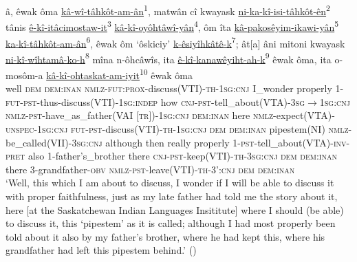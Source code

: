 \documentclass[twoside,a4paper,11pt]{article}
\newcommand{\sg}{\textsc{sg}}
\newcommand{\Σ}{\greek{Σ}}
\newcommand{\cnj}{\textsc{cnj}}
\newcommand{\dem}{\textsc{dem}}
\newcommand{\fut}{\textsc{fut}}
\newcommand{\inan}{\textsc{inan}}
\newcommand{\indep}{\textsc{indep}}
\newcommand{\inv}{\textsc{inv}}
\newcommand{\nmlz}{\textsc{nmlz}}
\newcommand{\obv}{\textsc{obv}}
\newcommand{\pret}{\textsc{pret}}
\newcommand{ \prox}{\textsc{prox}}
\newcommand{\pst}{\textsc{pst}}
\newcommand{\theme}{\textsc{th}}
\newcommand{\tr}{\textsc{tr}}
\newcommand{\unspec}{\textsc{unspec}}
\begin{document}
\begin{exe}
\ex \label{ex:creeverbs}
 \gll â, êwak ôma \underline{kâ-wî-tâhkôt-am-ân}\textsf{\textsuperscript{1}}, {matwân cî} kwayask \underline{ni-ka-kî-isi-tâhkôt-ên}\textsf{\textsuperscript{2}} tânis \underline{ê-kî-itâcimostaw-it}\textsf{\textsuperscript{3}} \underline{kâ-kî-oyôhtâwî-yân}\textsf{\textsuperscript{4}}, ôm îta \underline{kâ-pakosêyim-ikawi-yân}\textsf{\textsuperscript{5}} \underline{ka-kî-tâhkôt-am-ân}\textsf{\textsuperscript{6}}, êwak ôm `ôskiciy' \underline{k-êsiyîhkâtê-k}\textsf{\textsuperscript{7}}; ât[a] âni mitoni kwayask \underline{ni-kî-wîhtamâ-ko-h}\textsf{\textsuperscript{8}} mîna n-ôhcâwîs, ita \underline{ê-kî-kanawêyiht-ah-k}\textsf{\textsuperscript{9}} êwak ôma, ita o-mosôm-a \underline{kâ-kî-ohtaskat-am-iyit}\textsf{\textsuperscript{10}} êwak ôma\\
well {\dem} {\dem{:}\inan} {\nmlz-\fut{:}\prox-discuss(VTI)-\theme-1\sg{:}\cnj} {I\_wonder} properly {1-\fut-\pst-thus-discuss(VTI)-1\sg:\indep} how {\cnj-\pst-tell\_about(VTA)-3\sg$\rightarrow$1\sg{:}\cnj} {\nmlz-\pst-have\_as\_father(VAI [\tr])-1\sg{:}\cnj} {\dem{:}\inan} here {\nmlz-expect(VTA)-\unspec-1\sg{:}\cnj} {\fut-\pst-discuss(VTI)-\theme-1\sg{:}\cnj} {\dem} {\dem{:}\inan} {pipestem(NI)} {\nmlz-be\_called(VII)-3\sg{:}\cnj} although then really properly {1-\pst-tell\_about(VTA)-\inv-\pret} {also} {1-father's\_brother} there {\cnj-\pst-keep(VTI)-\theme-3\sg{:}\cnj} {\dem} {\dem{:}\inan} there {3-grandfather-\obv} {\nmlz-\pst-leave(VTI)-\theme-3'{:}\cnj} {\dem} {\dem{:}\inan}\\
\glt `Well, this which I am about to discuss, I wonder if I will be able to discuss it with proper faithfulness, just as my late father had told me the story about it, here [at the Saskatchewan Indian Languages Insititute] where I should (be able) to discuss it, this `pipestem' as it is called; although I had most properly been told about it also by my father's brother, where he had kept this, where his grandfather had left this pipestem behind.' (\citealp[p. 107]{counselling})
\end{exe}
\end{document}

